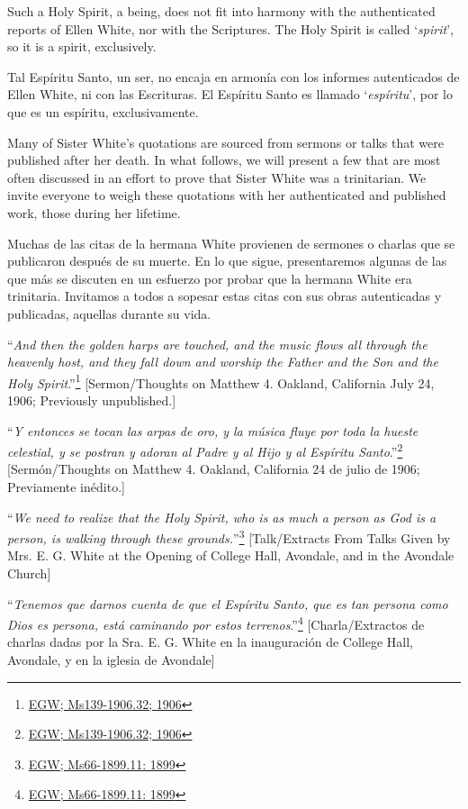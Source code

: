 Such a Holy Spirit, a being, does not fit into harmony with the authenticated reports of Ellen White, nor with the Scriptures. The Holy Spirit is called ‘\textit{spirit}’, so it is a spirit, exclusively.


Tal Espíritu Santo, un ser, no encaja en armonía con los informes autenticados de Ellen White, ni con las Escrituras. El Espíritu Santo es llamado ‘\textit{espíritu}’, por lo que es un espíritu, exclusivamente.


Many of Sister White’s quotations are sourced from sermons or talks that were published after her death. In what follows, we will present a few that are most often discussed in an effort to prove that Sister White was a trinitarian. We invite everyone to weigh these quotations with her authenticated and published work, those during her lifetime.


Muchas de las citas de la hermana White provienen de sermones o charlas que se publicaron después de su muerte. En lo que sigue, presentaremos algunas de las que más se discuten en un esfuerzo por probar que la hermana White era trinitaria. Invitamos a todos a sopesar estas citas con sus obras autenticadas y publicadas, aquellas durante su vida.


“\textit{And then the golden harps are touched, and the music flows all through the heavenly host, and they fall down and worship the Father and the Son and the Holy Spirit}.”\footnote{\href{https://egwwritings.org/?ref=en_Ms139-1906.32&para=9579.38}{EGW; Ms139-1906.32; 1906}} [Sermon/Thoughts on Matthew 4. Oakland, California July 24, 1906; Previously unpublished.]


“\textit{Y entonces se tocan las arpas de oro, y la música fluye por toda la hueste celestial, y se postran y adoran al Padre y al Hijo y al Espíritu Santo}.”\footnote{\href{https://egwwritings.org/?ref=en_Ms139-1906.32&para=9579.38}{EGW; Ms139-1906.32; 1906}} [Sermón/Thoughts on Matthew 4. Oakland, California 24 de julio de 1906; Previamente inédito.]


“\textit{We need to realize that the Holy Spirit, who is as much a person as God is a person, is walking through these grounds.}”\footnote{\href{https://egwwritings.org/?ref=en_Ms66-1899.11&para=6622.19}{EGW; Ms66-1899.11: 1899}} [Talk/Extracts From Talks Given by Mrs. E. G. White at the Opening of College Hall, Avondale, and in the Avondale Church]


“\textit{Tenemos que darnos cuenta de que el Espíritu Santo, que es tan persona como Dios es persona, está caminando por estos terrenos}.”\footnote{\href{https://egwwritings.org/?ref=en_Ms66-1899.11&para=6622.19}{EGW; Ms66-1899.11: 1899}} [Charla/Extractos de charlas dadas por la Sra. E. G. White en la inauguración de College Hall, Avondale, y en la iglesia de Avondale]
